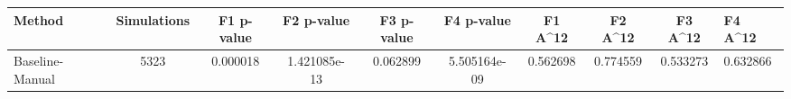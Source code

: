 \begin{tabular}{lcccccccc}
\toprule
         Method &  Simulations &  F1 p-value &   F2 p-value &  F3 p-value &   F4 p-value &  F1 A^12 &  F2 A^12 &  F3 A^12 &  F4 A^12 \\
\midrule
Baseline-Manual &         5323 &    0.000018 & 1.421085e-13 &    0.062899 & 5.505164e-09 & 0.562698 & 0.774559 & 0.533273 & 0.632866 \\
\bottomrule
\end{tabular}
